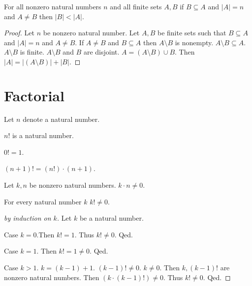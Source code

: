 \documentclass{article}
\begin{document}
\begin{forthel}
\begin{lemma}
	For all nonzero natural numbers $n$ and all finite sets $A, B$
	if $B \subseteq A$ and $|A| = n$ and $A \neq B$
	then $|B| < |A|$.
\end{lemma}
\begin{proof}
	Let $n$ be nonzero natural number.
	Let $A,B$ be finite sets such that 
	$B \subseteq A$ and $|A|=n$ and $A \neq B$.
	If $A \neq B$ and $B \subseteq A$ then
	$A \setminus B$ is nonempty.
	$A \setminus B \subseteq A$.
	$A \setminus B$ is finite.
	$A \setminus B$ and $B$ are disjoint.
	$A = (A \setminus B) \cup B$.
	Then $|A| = |(A \setminus B)| + |B|$.
\end{proof}


\end{forthel}

\section{Factorial}

\begin{forthel}

Let $n$ denote a natural number.
\begin{signature}
$n!$ is a natural number.
\end{signature}

\begin{axiom}
$0!=1$.
\end{axiom}

\begin{axiom}
$(n+1)!=(n!) \cdot (n+1)$.
\end{axiom}

\begin{lemma}
Let $k,n$ be nonzero natural numbers. $k \cdot n \neq 0$. 
\end{lemma}

\begin{theorem}
For every natural number $k$ $k! \neq 0$.
\end{theorem}
\begin{proof}[by induction on $k$]
Let $k$ be a natural number.

Case $k = 0$.Then $k! = 1$. Thus $k! \neq 0$. Qed.

Case $k = 1$. Then $k! = 1 \neq 0$. Qed.

Case $k > 1$. $k = (k-1)+1$. $(k-1)! \neq 0$. $k \neq 0$. Then $k, (k-1)!$ are nonzero natural numbers.
Then $(k \cdot (k-1)!) \neq 0$. Thus $k! \neq 0$.  Qed.
\end{proof} 

\end{forthel}
\end{document}
